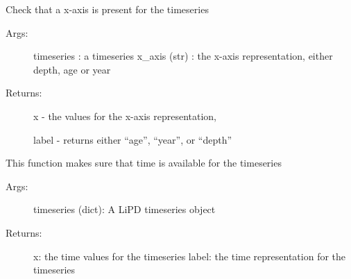 \documentclass[letterpaper,10pt,english]{sphinxmanual}
\begin{document}
\begin{fulllineitems}
\label{\detokenize{LIPDutils:pyleoclim.LipdUtils.checkXaxis}}
Check that a x-axis is present for the timeseries
\begin{description}
\item[{Args:}] \leavevmode
timeseries : a timeseries
x\_axis (str) : the x-axis representation, either depth, age or year

\item[{Returns:}] \leavevmode
x - the values for the x-axis representation,

label - returns either “age”, “year”, or “depth”

\end{description}

\end{fulllineitems}


\begin{fulllineitems}
\label{\detokenize{LIPDutils:pyleoclim.LipdUtils.checkTimeAxis}}
This function makes sure that time is available for the timeseries
\begin{description}
\item[{Args:}] \leavevmode
timeseries (dict): A LiPD timeseries object

\item[{Returns:}] \leavevmode
x: the time values for the timeseries
label: the time representation for the timeseries

\end{description}

\end{fulllineitems}

\end{document}
